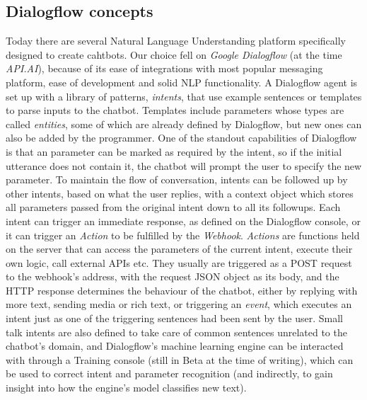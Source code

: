 \subsection*{Dialogflow concepts}
Today there are several Natural Language Understanding platform specifically designed to create cahtbots. Our choice fell on \textit{Google Dialogflow} (at the time \textit{API.AI}), because of its ease of integrations with most popular messaging platform, ease of development and solid NLP functionality. A Dialogflow agent is set up with a library of patterns, \textit{intents}, that use example sentences or templates to parse inputs to the chatbot. Templates include parameters whose types are called \textit{entities}, some of which are already defined by Dialogflow, but new ones can also be added by the programmer. One of the standout capabilities of Dialogflow is that an parameter can be marked as required by the intent, so if the initial utterance does not contain it, the chatbot will prompt the user to specify the new parameter. To maintain the flow of conversation, intents can be followed up by other intents, based on what the user replies, with a context object which stores all parameters passed from the original intent down to all its followups. Each intent can trigger an immediate response, as defined on the Dialogflow console, or it can trigger an \textit{Action} to be fulfilled by the \textit{Webhook}. \textit{Actions} are functions held on the server that can access the parameters of the current intent, execute their own logic, call external APIs etc. They usually are triggered as a POST request to the webhook's address, with the request JSON object as its body, and the HTTP response determines the behaviour of the chatbot, either by replying with more text, sending media or rich text, or triggering an \textit{event}, which executes an intent just as one of the triggering sentences had been sent by the user. Small talk intents are also defined to take care of common sentences unrelated to the chatbot's domain, and Dialogflow's machine learning engine can be interacted with through a Training console (still in Beta at the time of writing), which can be used to correct intent and parameter recognition (and indirectly, to gain insight into how the engine's model classifies new text).


